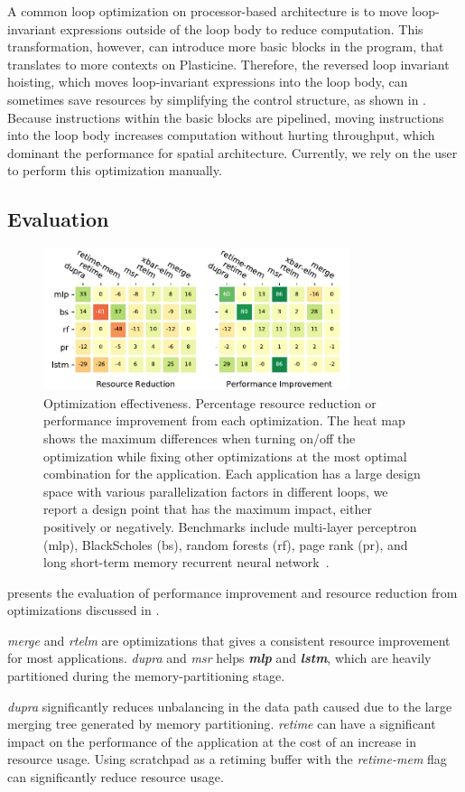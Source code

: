 A common loop optimization on processor-based architecture is to move loop-invariant expressions 
outside of the loop body to reduce computation. 
This transformation, however, can introduce more basic blocks in the program, that translates to
more contexts on Plasticine.
Therefore, the reversed loop invariant hoisting, which moves loop-invariant expressions into the loop body, can sometimes save resources by simplifying the control structure, as shown in 
.
Because instructions within the basic blocks are pipelined, 
moving instructions into the loop body increases computation without hurting throughput, which
dominant the performance for spatial architecture.
Currently, we rely on the user to perform this optimization manually.

\subsection{Evaluation}

\begin{figure}
\centering
\includegraphics[width=0.8\textwidth]{figs/heat.pdf}
\caption[Optimization effectiveness]{
  Optimization effectiveness. Percentage resource reduction or performance improvement from each optimization. 
The heat map shows the maximum differences when turning on/off the optimization while fixing other optimizations at the most optimal combination for the application.
  Each application has a large design space with various parallelization factors in different loops, 
  we report a design point that has the maximum impact, either positively or negatively.
  Benchmarks include multi-layer perceptron (mlp), BlackScholes (bs), random forests (rf), page rank
  (pr), and long short-term memory recurrent neural network~\cite{hochreiter1997long}.
}
\label{fig:heat}
\end{figure}

 presents the evaluation of performance improvement and resource reduction from
optimizations discussed in .

\emph{merge} and \emph{rtelm} are optimizations that gives a consistent resource improvement for most applications.
\emph{dupra} and \emph{msr} helps \emph{\bf mlp} and \emph{\bf lstm}, which are heavily partitioned during the memory-partitioning stage.

\emph{dupra} significantly reduces unbalancing in the data path caused due to the large merging tree generated by memory partitioning.
\emph{retime} can have a significant impact on the performance of the application at the cost of an increase in resource usage.
Using scratchpad as a retiming buffer with the \emph{retime-mem} flag can significantly reduce resource usage.

